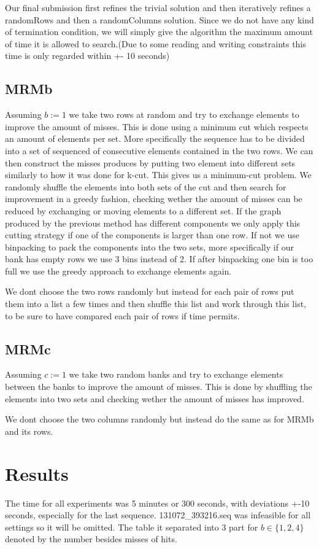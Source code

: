 \documentclass[11pt]{article}
\begin{document}
Our final submission first refines the trivial solution and then iteratively refines a randomRows and then a randomColumns solution. Since we do not have any kind of termination condition, we will simply give the algorithm the maximum amount of time it is allowed to search.(Due to some reading and writing constraints this time is only regarded within +- 10 seconds)

\subsection{MRMb}
Assuming $b:=1$ we take two rows at random and try to exchange elements to improve the amount of misses. This is done using a minimum cut which respects an amount of elements per set. More specifically the sequence has to be divided into a set of sequenced of consecutive elements contained in the two rows. We can then construct the misses produces by putting two element into different sets similarly to how it was done for k-cut. This gives us a minimum-cut problem. We randomly shuffle the elements into both sets of the cut and then search for improvement in a greedy fashion, checking wether the amount of misses can be reduced by exchanging or moving elements to a different set. If the graph produced by the previous method has different components we only apply this cutting strategy if one of the components is larger than one row. If not we use binpacking to pack the components into the two sets, more specifically if our bank has empty rows we use 3 bins instead of 2. If after binpacking one bin is too full we use the greedy approach to exchange elements again.

We dont choose the two rows randomly but instead for each pair of rows put them into a list a few times and then shuffle this list and work through this list, to be sure to have compared each pair of rows if time permits.

\subsection{MRMc}
Assuming $c:=1$ we take two random banks and try to exchange elements between the banks to improve the amount of misses. This is done by shuffling the elements into two sets and checking wether the amount of misses has improved.

We dont choose the two columns randomly but instead do the same as for MRMb and its rows.

\section{Results}
The time for all experiments was 5 minutes or 300 seconds, with deviations +-10 seconds, especially for the last sequence. 131072\_393216.seq was infeasible for all settings so it will be omitted. The table it separated into 3 part for $b \in \{1,2,4\}$ denoted by the number besides misses of hits.
\end{document}
